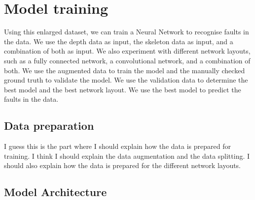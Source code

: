 \section{Model training}
\label{sec:model_training}

Using this enlarged dataset, we can train a Neural Network to recognise faults in the data. We use the depth data as input, the skeleton data as input, and a combination of both as input. We also experiment with different network layouts, such as a fully connected network, a convolutional network, and a combination of both. We use the augmented data to train the model and the manually checked ground truth to validate the model. We use the validation data to determine the best model and the best network layout. We use the best model to predict the faults in the data. 

\subsection{Data preparation}

I guess this is the part where I should explain how the data is prepared for training. I think I should explain the data augmentation and the data splitting. I should also explain how the data is prepared for the different network layouts.

\subsection{Model Architecture}


